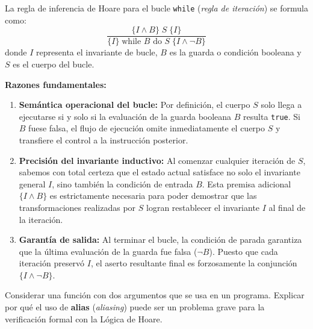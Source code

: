 \begin{solucion}
La regla de inferencia de Hoare para el bucle \texttt{while} (\textit{regla de iteración}) se formula como:
\[
\frac{\{I \land B\} \; S \; \{I\}}{\{I\} \; \text{while } B \text{ do } S \; \{I \land \neg B\}}
\]
donde $I$ representa el invariante de bucle, $B$ es la guarda o condición booleana y $S$ es el cuerpo del bucle.

\textbf{Razones fundamentales:}
\begin{enumerate}
    \item \textbf{Semántica operacional del bucle:} Por definición, el cuerpo $S$ solo llega a ejecutarse si y solo si la evaluación de la guarda booleana $B$ resulta \texttt{true}. Si $B$ fuese falsa, el flujo de ejecución omite inmediatamente el cuerpo $S$ y transfiere el control a la instrucción posterior.
    \item \textbf{Precisión del invariante inductivo:} Al comenzar cualquier iteración de $S$, sabemos con total certeza que el estado actual satisface no solo el invariante general $I$, sino también la condición de entrada $B$. Esta premisa adicional $\{I \land B\}$ es estrictamente necesaria para poder demostrar que las transformaciones realizadas por $S$ logran restablecer el invariante $I$ al final de la iteración.
    \item \textbf{Garantía de salida:} Al terminar el bucle, la condición de parada garantiza que la última evaluación de la guarda fue falsa ($\neg B$). Puesto que cada iteración preservó $I$, el aserto resultante final es forzosamente la conjunción $\{I \land \neg B\}$.
\end{enumerate}
\end{solucion}

\begin{ejercicio}
Considerar una función con dos argumentos que se usa en un programa. Explicar por qué el uso de \textbf{alias} (\textit{aliasing}) puede ser un problema grave para la verificación formal con la Lógica de Hoare.
\end{ejercicio}

